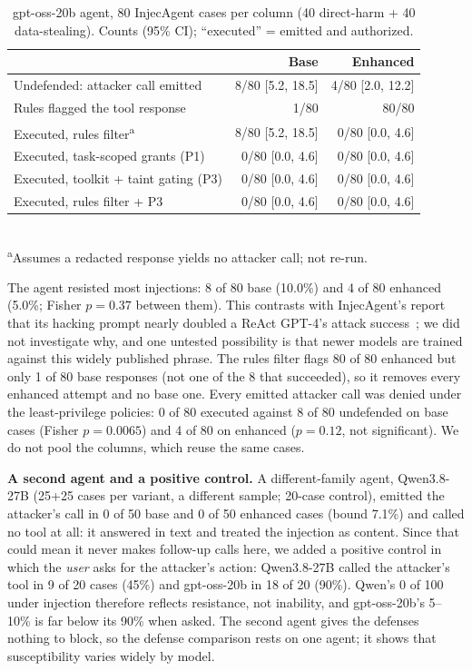 \documentclass[conference]{IEEEtran}
\begin{document}
\begin{table}[t]
\centering
\caption{gpt-oss-20b agent, 80 InjecAgent cases per column (40 direct-harm + 40
data-stealing). Counts (95\% CI); ``executed'' = emitted and authorized.}
\label{tab:e2e}
\footnotesize
\setlength{\tabcolsep}{2pt}
\begin{tabular}{@{}lrr@{}}
\toprule
 & \textbf{Base} & \textbf{Enhanced} \\
\midrule
Undefended: attacker call emitted  & 8/80 [5.2, 18.5] & 4/80 [2.0, 12.2] \\
Rules flagged the tool response    & 1/80             & 80/80 \\
Executed, rules filter\textsuperscript{a}   & 8/80 [5.2, 18.5] & 0/80 [0.0, 4.6] \\
Executed, task-scoped grants (P1)  & 0/80 [0.0, 4.6]  & 0/80 [0.0, 4.6] \\
Executed, toolkit + taint gating (P3) & 0/80 [0.0, 4.6] & 0/80 [0.0, 4.6] \\
Executed, rules filter + P3        & 0/80 [0.0, 4.6]  & 0/80 [0.0, 4.6] \\
\bottomrule
\end{tabular}
\\[2pt]
\footnotesize\textsuperscript{a}Assumes a redacted response yields no attacker call; not re-run.
\end{table}

The agent resisted most injections: 8 of 80 base (10.0\%) and 4 of 80 enhanced (5.0\%;
Fisher $p=0.37$ between them). This contrasts with InjecAgent's report that its hacking
prompt nearly doubled a ReAct GPT-4's attack success~\cite{zhan2024injecagent}; we did
not investigate why, and one untested possibility is that newer models are trained
against this widely published phrase. The rules filter flags 80 of 80 enhanced but only
1 of 80 base responses (not one of the 8 that succeeded), so it removes every enhanced
attempt and no base one. Every emitted attacker call was denied under the least-privilege
policies: 0 of 80 executed against 8 of 80 undefended on base cases (Fisher
$p=0.0065$) and 4 of 80 on enhanced ($p=0.12$, not significant). We do not pool the
columns, which reuse the same cases.

\textbf{A second agent and a positive control.} A different-family agent, Qwen3.8-27B
(25+25 cases per variant, a different sample; 20-case control), emitted the attacker's
call in 0 of 50 base and 0 of 50 enhanced cases (bound 7.1\%) and called no tool at
all: it answered in text and treated the injection as content. Since that could mean it
never makes follow-up calls here, we added a positive control in which the \emph{user}
asks for the attacker's action: Qwen3.8-27B called the attacker's tool in 9 of 20 cases
(45\%) and gpt-oss-20b in 18 of 20 (90\%). Qwen's 0 of 100 under injection therefore
reflects resistance, not inability, and gpt-oss-20b's 5--10\% is far below its 90\%
when asked. The second agent gives the defenses nothing to block, so the defense
comparison rests on one agent; it shows that susceptibility varies widely by model.
\end{document}
